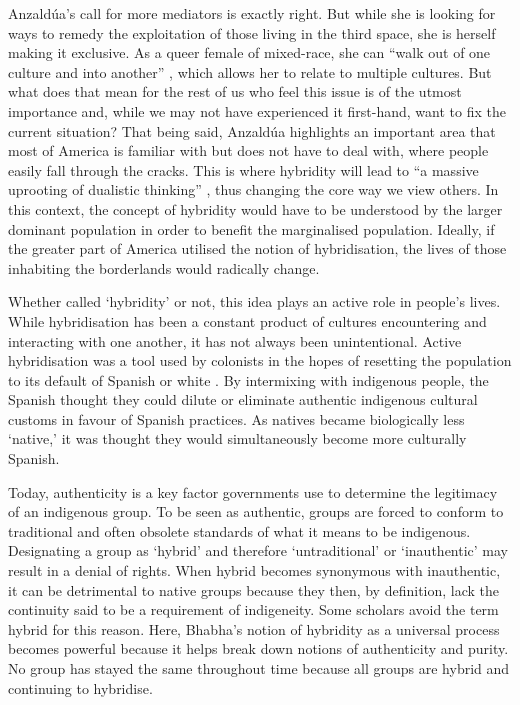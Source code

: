 	Anzaldúa’s call for more mediators \parencite[78]{Anzaldua_1987}  is exactly right. But while she is looking for ways to remedy the exploitation of those living in the third space, she is herself making it exclusive. As a queer female of mixed-race, she can “walk out of one culture and into another” \parencite[77]{Anzaldua_1987}, which allows her to relate to multiple cultures. But what does that mean for the rest of us who feel this issue is of the utmost importance and, while we may not have experienced it first-hand, want to fix the current situation? That being said, Anzaldúa highlights an important area that most of America is familiar with but does not have to deal with, where people easily fall through the cracks. This is where hybridity will lead to “a massive uprooting of dualistic thinking” \parencite[80]{Anzaldua_1987}, thus changing the core way we view others. In this context, the concept of hybridity would have to be understood by the larger dominant population in order to benefit the marginalised population. Ideally, if the greater part of America utilised the notion of hybridisation, the lives of those inhabiting the borderlands would radically change. 
	
	Whether called ‘hybridity’ or not, this idea plays an active role in people’s lives. While hybridisation has been a constant product of cultures encountering and interacting with one another, it has not always been unintentional. Active hybridisation was a tool used by colonists in the hopes of resetting the population to its default of Spanish or white \parencite[42]{Warren_1998}. By intermixing with indigenous people, the Spanish thought they could dilute or eliminate authentic indigenous cultural customs in favour of Spanish practices. As natives became biologically less ‘native,’ it was thought they would simultaneously become more culturally Spanish. 
	
	Today, authenticity is a key factor governments use to determine the legitimacy of an indigenous group.  To be seen as authentic, groups are forced to conform to traditional and often obsolete standards of what it means to be indigenous. Designating a group as ‘hybrid’ and therefore ‘untraditional’ or ‘inauthentic’ may result in a denial of rights. When hybrid becomes synonymous with inauthentic, it can be detrimental to native groups because they then, by definition, lack the continuity said to be a requirement of indigeneity. Some scholars avoid the term hybrid for this reason. Here, Bhabha’s notion of hybridity as a universal process becomes powerful because it helps break down notions of authenticity and purity. No group has stayed the same throughout time because all groups are hybrid and continuing to hybridise.
	

